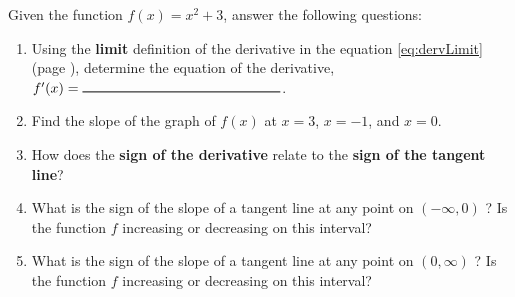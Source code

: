 \begin{example}
\begin{comment}
Use the the \textbf{limit} definition of the derivative  in the equation \ref{eq:dervLimit} (page \pageref{eq:dervLimit}) to \textbf{determine the derivative}, $f^\prime(x)$, for the function \(f(x)=x^2+3\).
\begin{center}
$f^\prime(x)=\rule{5cm}{0.25mm}$
\end{center}
Then, answer the following questions: 
\end{comment}
Given the function \(f(x)=x^2+3\), answer the following questions:
\begin{enumerate}
    \item Using the \textbf{limit} definition of the derivative in the equation \ref{eq:dervLimit} (page \pageref{eq:dervLimit}), determine the equation of the derivative, $f^\prime(x)=\rule{5cm}{0.25mm}$.
    \item Find the slope of the graph of $f(x)$ at $x=3$, $x=-1$, and $x=0$. 
    \item How does the \textbf{sign of the derivative} relate to the \textbf{sign of the tangent line}?
    \item What is the sign of the slope of a tangent line at any point on $(-\infty,0)$ ? Is the function \(f\) increasing or decreasing on this interval?
     \item What is the sign of the slope of a tangent line at any point on $(0,\infty)$ ? Is the function \(f\) increasing or decreasing on this interval?
\end{enumerate}
 \vspace{-0.5cm}
 
\begin{figure}[h]
\hspace*{-9cm}
\end{figure}
\end{example}
